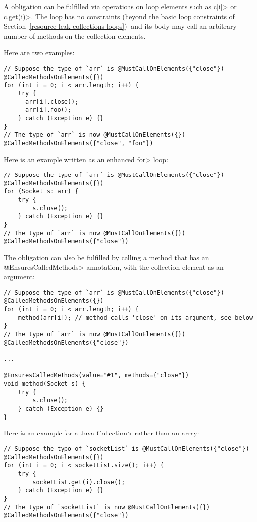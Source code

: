 A \MustCallOnElements obligation can be fulfilled via operations on loop
elements such as \<c[i]> or \<c.get(i)>.
The loop has no constraints (beyond the basic loop constraints of
Section~\ref{resource-leak-collections-loops}), and its body may call an
arbitrary number of methods on the collection elements.

Here are two examples:

\begin{verbatim}
// Suppose the type of `arr` is @MustCallOnElements({"close"}) @CalledMethodsOnElements({})
for (int i = 0; i < arr.length; i++) {
    try {
      arr[i].close();
      arr[i].foo();
    } catch (Exception e) {}
}
// The type of `arr` is now @MustCallOnElements({}) @CalledMethodsOnElements({"close", "foo"})
\end{verbatim}

Here is an example written as an enhanced \<for> loop:

\begin{verbatim}
// Suppose the type of `arr` is @MustCallOnElements({"close"}) @CalledMethodsOnElements({})
for (Socket s: arr) {
    try {
        s.close();
    } catch (Exception e) {}
}
// The type of `arr` is now @MustCallOnElements({}) @CalledMethodsOnElements({"close"})
\end{verbatim}


The obligation can also be fulfilled by calling a method that has an
\<@EnsuresCalledMethods> annotation, with the collection element as an
argument:
\begin{verbatim}
// Suppose the type of `arr` is @MustCallOnElements({"close"}) @CalledMethodsOnElements({})
for (int i = 0; i < arr.length; i++) {
    method(arr[i]); // method calls 'close' on its argument, see below
}
// The type of `arr` is now @MustCallOnElements({}) @CalledMethodsOnElements({"close"})

...

@EnsuresCalledMethods(value="#1", methods={"close"})
void method(Socket s) {
    try {
        s.close();
    } catch (Exception e) {}
}
\end{verbatim}

Here is an example for a Java \<Collection> rather than an array:

\begin{verbatim}
// Suppose the typo of `socketList` is @MustCallOnElements({"close"}) @CalledMethodsOnElements({})
for (int i = 0; i < socketList.size(); i++) {
    try {
        socketList.get(i).close();
    } catch (Exception e) {}
}
// The type of `socketList` is now @MustCallOnElements({}) @CalledMethodsOnElements({"close"})
\end{verbatim}

